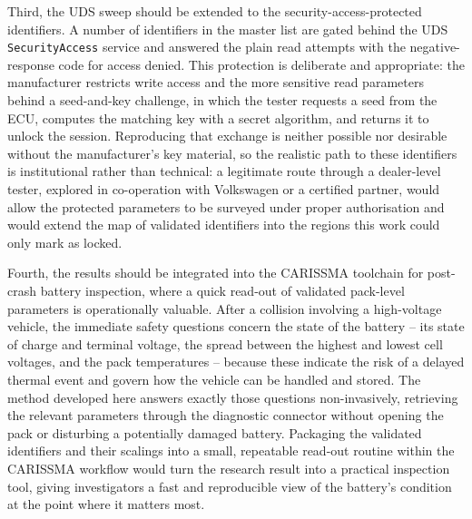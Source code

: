 \documentclass[11pt,a4paper,oneside,parskip=half]{scrreprt}
\begin{document}
Third, the UDS sweep should be extended to the security-access-protected identifiers. A number of identifiers in the master list are gated behind the UDS \texttt{SecurityAccess} service and answered the plain read attempts with the negative-response code for access denied. This protection is deliberate and appropriate: the manufacturer restricts write access and the more sensitive read parameters behind a seed-and-key challenge, in which the tester requests a seed from the ECU, computes the matching key with a secret algorithm, and returns it to unlock the session. Reproducing that exchange is neither possible nor desirable without the manufacturer's key material, so the realistic path to these identifiers is institutional rather than technical: a legitimate route through a dealer-level tester, explored in co-operation with Volkswagen or a certified partner, would allow the protected parameters to be surveyed under proper authorisation and would extend the map of validated identifiers into the regions this work could only mark as locked.

Fourth, the results should be integrated into the CARISSMA toolchain for post-crash battery inspection, where a quick read-out of validated pack-level parameters is operationally valuable. After a collision involving a high-voltage vehicle, the immediate safety questions concern the state of the battery -- its state of charge and terminal voltage, the spread between the highest and lowest cell voltages, and the pack temperatures -- because these indicate the risk of a delayed thermal event and govern how the vehicle can be handled and stored. The method developed here answers exactly those questions non-invasively, retrieving the relevant parameters through the diagnostic connector without opening the pack or disturbing a potentially damaged battery. Packaging the validated identifiers and their scalings into a small, repeatable read-out routine within the CARISSMA workflow would turn the research result into a practical inspection tool, giving investigators a fast and reproducible view of the battery's condition at the point where it matters most.

\clearpage



\appendix
\end{document}
